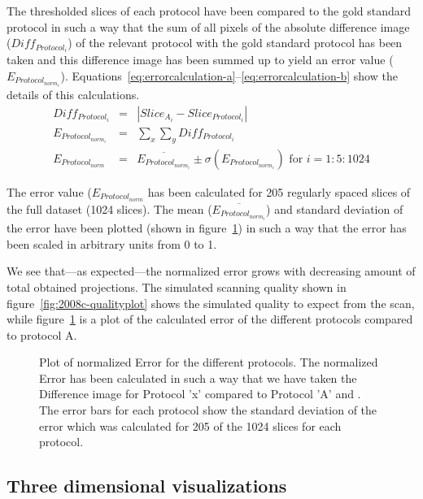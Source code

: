The thresholded slices of each protocol have been compared to the gold standard protocol in such a way that the sum of all pixels of the absolute difference image ($Diff_{Protocol_{i}}$) of the relevant protocol with the gold standard protocol has been taken and this difference image has been summed up to yield an error value ($E_{Protocol_{norm_{i}}}$). Equations~\ref{eq:errorcalculation-a}--\ref{eq:errorcalculation-b} show the details of this calculations.
\begin{eqnarray}
    Diff_{Protocol_{i}} &=& |Slice_{A_{i}}-Slice_{Protocol_{i}}| \label{eq:errorcalculation-a}\\
E_{Protocol_{norm_{i}}} &=& \sum_{x}\sum_{y} Diff_{Protocol_{i}} \label{eq:errorcalculation-b}\\
    E_{Protocol_{norm}} &=& \overline{E_{Protocol_{norm_{i}}}} \pm \sigma(E_{Protocol_{norm_{i}}}) \textrm{ for } i=1:5:1024 \label{eq:errorcalculation-c}
\end{eqnarray}

The error value ($E_{Protocol_{norm}}$ has been calculated for 205 regularly spaced slices of the full dataset (1024 slices). The mean ($\overline{E_{Protocol_{norm_{i}}}}$) and standard deviation of the error have been plotted (shown in figure~\ref{fig:NormalizedErrorPlot}) in such a way that the error has been scaled in arbitrary units from 0 to 1.

We see that---as expected---the normalized error grows with decreasing amount of total obtained projections. The simulated scanning quality shown in figure~\ref{fig:2008c-qualityplot} shows the simulated quality to expect from the scan, while figure~\ref{fig:NormalizedErrorPlot} is a plot of the calculated error of the different protocols compared to protocol A.

\begin{figure}
	\centering
		
	\caption{Plot of normalized Error for the different protocols. The normalized Error has been calculated in such a way that we have taken the Difference image for Protocol 'x' compared to Protocol 'A' and . The error bars for each protocol show the standard deviation of the error which was calculated for 205 of the 1024 slices for each protocol.}
	\label{fig:NormalizedErrorPlot}
\end{figure}

\subsection{Three dimensional visualizations}
